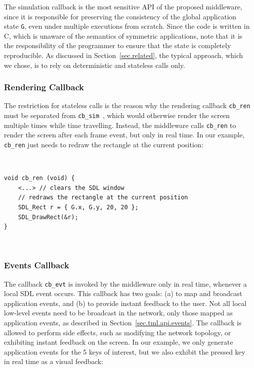 \documentclass[10pt,journal,compsoc]{IEEEtran}
\newcommand{\code}[1]  {\texttt{\small{#1}}}
\begin{document}
The simulation callback is the most sensitive API of the proposed middleware,
since it is responsible for preserving the consistency of the global
application state \code{G}, even under multiple executions from scratch.
%
Since the code is written in C, which is unaware of the semantics of symmetric
applications, note that it is the responsibility of the programmer to ensure
that the state is completely reproducible.
%
As discussed in Section~\ref{sec.related}, the typical approach, which we
chose, is to rely on deterministic and stateless calls only.

\subsubsection{Rendering Callback}
\label{sec.tml.api.cb_ren}

The restriction for stateless calls is the reason why the rendering callback
\code{cb\_ren} must be separated from \code{cb\_sim}~\cite{tml.js}, which would
otherwise render the screen multiple times while time travelling.
Instead, the middleware calls \code{cb\_ren} to render the screen after each
frame event, but only in real time.
In our example, \code{cb\_ren} just needs to redraw the rectangle at the
current position:

{\footnotesize
~
\begin{verbatim}
void cb_ren (void) {
    <...> // clears the SDL window
    // redraws the rectangle at the current position
    SDL_Rect r = { G.x, G.y, 20, 20 };
    SDL_DrawRect(&r);
}
\end{verbatim}
~
}

\subsubsection{Events Callback}
\label{sec.tml.api.cb_evt}

The callback \code{cb\_evt} is invoked by the middleware only in real time,
whenever a local SDL event occurs.
This callback has two goals:
    (a) to map and broadcast application events, and
    (b) to provide instant feedback to the user.
Not all local low-level events need to be broadcast in the network, only those
mapped as application events, as described in Section~\ref{sec.tml.api.events}.
The callback is allowed to perform side effects, such as modifying the network
topology, or exhibiting instant feedback on the screen.
In our example, we only generate application events for the 5 keys of interest,
but we also exhibit the pressed key in real time as a visual
feedback:
\end{document}

